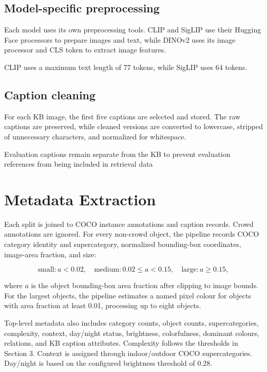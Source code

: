 \documentclass{article}
\begin{document}
\subsection{Model-specific
preprocessing}\label{model-specific-preprocessing}

Each model uses its own preprocessing tools. CLIP and SigLIP use
their Hugging Face processors to prepare images and text, while
DINOv2 uses its image processor and CLS token to extract image
features.

CLIP uses a maximum text length of 77 tokens, while SigLIP uses
64 tokens.

\subsection{Caption cleaning}\label{caption-cleaning}

For each KB image, the first five captions are selected and stored.
The raw captions are preserved, while cleaned versions are converted
to lowercase, stripped of unnecessary characters, and normalized
for whitespace.

Evaluation captions remain separate from the KB to prevent evaluation
references from being included in retrieval data

\section{Metadata Extraction}\label{metadata-extraction}

Each split is joined to COCO instance annotations and caption records.
Crowd annotations are ignored. For every non-crowd object, the pipeline
records COCO category identity and supercategory, normalized
bounding-box coordinates, image-area fraction, and size:

\[
\text{small}:a<0.02,\quad
\text{medium}:0.02\leq a<0.15,\quad
\text{large}:a\geq0.15,
\]

where \(a\) is the object bounding-box area fraction after clipping to
image bounds. For the largest objects, the pipeline estimates a named
pixel colour for objects with area fraction at least 0.01, processing up
to eight objects.

Top-level metadata also includes category counts, object counts,
supercategories, complexity, context, day/night status, brightness,
colorfulness, dominant colours, relations, and KB caption attributes.
Complexity follows the thresholds in Section 3. Context is assigned
through indoor/outdoor COCO supercategories. Day/night is based on the
configured brightness threshold of 0.28.
\end{document}
